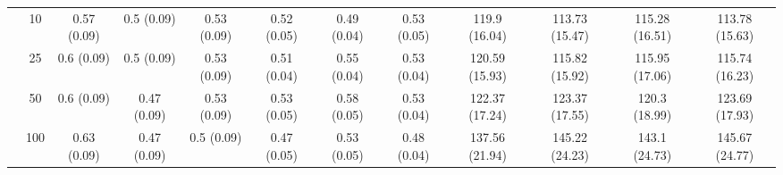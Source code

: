 \documentclass[11pt]{article}
\theoremstyle{definition}
\begin{document}
\begin{landscape}
\begin{table}[b]
\begin{center}
{\begin{tabular}{cc|ccc|ccc|cccc|}
    & 10  & 0.57 (0.09) & 0.5 (0.09) & 0.53 (0.09) & 0.52 (0.05) & 0.49 (0.04) & 0.53 (0.05) & 119.9 (16.04) & 113.73 (15.47) & 115.28 (16.51) & 113.78 (15.63) \\ 
    & 25  & 0.6 (0.09) & 0.5 (0.09) & 0.53 (0.09) & 0.51 (0.04) & 0.55 (0.04) & 0.53 (0.04) & 120.59 (15.93) & 115.82 (15.92) & 115.95 (17.06) & 115.74 (16.23) \\ 
    & 50  & 0.6 (0.09) & 0.47 (0.09) & 0.53 (0.09) & 0.53 (0.05) & 0.58 (0.05) & 0.53 (0.04) & 122.37 (17.24) & 123.37 (17.55) & 120.3 (18.99) & 123.69 (17.93) \\ 
    & 100  & 0.63 (0.09) & 0.47 (0.09) & 0.5 (0.09) & 0.47 (0.05) & 0.53 (0.05) & 0.48 (0.04) & 137.56 (21.94) & 145.22 (24.23) & 143.1 (24.73) & 145.67 (24.77) \\
\end{tabular}}
   \end{center}
\end{table}
\end{landscape}
\end{document}
